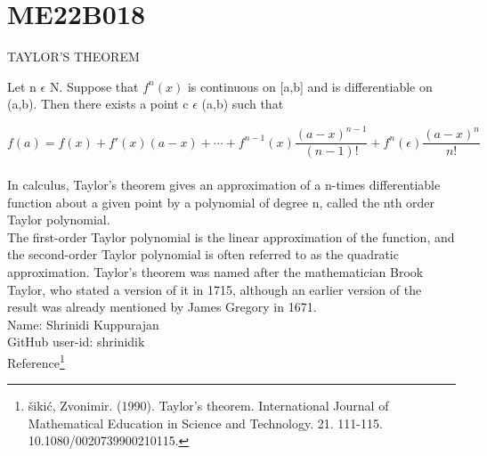 %
\section{ME22B018}
\begin{center}
	{\large TAYLOR'S THEOREM}
\end{center}
Let n \( \epsilon \) N. Suppose that \( f^{n}(x) \) is continuous on [a,b] and is differentiable on (a,b). Then there exists a point c \( \epsilon \) (a,b) such that

\[ f(a) = f(x) + f'(x)(a-x) + \cdots + f^{n-1}(x)\frac{(a-x)^{n-1}}{(n-1)\mathrm{!}} + f^{n}(\epsilon)\frac{(a-x)^{n}}{n\mathrm{!}} \]\\In calculus, Taylor's theorem gives an approximation of a n-times differentiable function about a given point by a polynomial of degree n, called the nth order Taylor polynomial.\\[\baselineskip]
The first-order Taylor polynomial is the linear approximation of the function, and the second-order Taylor polynomial is often referred to as the quadratic approximation. Taylor's theorem was named after the mathematician Brook Taylor, who stated a version of it in 1715, although an earlier version of the result was already mentioned by James Gregory in 1671.\\[\baselineskip]
Name: Shrinidi Kuppurajan\\
GitHub user-id: shrinidik\\[\baselineskip]
Reference\footnote{šikić, Zvonimir. (1990). Taylor's theorem. International Journal of Mathematical Education in Science and Technology. 21. 111-115. 10.1080/0020739900210115.}
%
